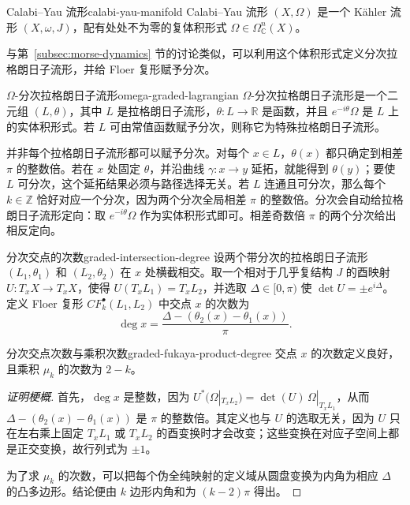 \begin{definition}{Calabi--Yau 流形}{calabi-yau-manifold}
Calabi--Yau 流形 $(X,\Omega)$ 是一个 Kähler 流形 $(X,\omega,J)$，配有处处不为零的复体积形式 $\Omega\in\Omega^n_{\mathbb C}(X)$。
\end{definition}

与第~\ref{subsec:morse-dynamics} 节的讨论类似，可以利用这个体积形式定义分次拉格朗日子流形，并给 Floer 复形赋予分次。

\begin{definition}{$\Omega$-分次拉格朗日子流形}{omega-graded-lagrangian}
$\Omega$-分次拉格朗日子流形是一个二元组 $(L,\theta)$，其中 $L$ 是拉格朗日子流形，$\theta\colon L\to\mathbb R$ 是函数，并且 $e^{-i\theta}\Omega$ 是 $L$ 上的实体积形式。若 $L$ 可由常值函数赋予分次，则称它为特殊拉格朗日子流形。
\end{definition}

并非每个拉格朗日子流形都可以赋予分次。对每个 $x\in L$，$\theta(x)$ 都只确定到相差 $\pi$ 的整数倍。若在 $x$ 处固定 $\theta$，并沿曲线 $\gamma\colon x\to y$ 延拓，就能得到 $\theta(y)$；要使 $L$ 可分次，这个延拓结果必须与路径选择无关。若 $L$ 连通且可分次，那么每个 $k\in\mathbb Z$ 恰好对应一个分次，因为两个分次全局相差 $\pi$ 的整数倍。分次会自动给拉格朗日子流形定向：取 $e^{-i\theta}\Omega$ 作为实体积形式即可。相差奇数倍 $\pi$ 的两个分次给出相反定向。

\begin{definition}{分次交点的次数}{graded-intersection-degree}
设两个带分次的拉格朗日子流形 $(L_1,\theta_1)$ 和 $(L_2,\theta_2)$ 在 $x$ 处横截相交。取一个相对于几乎复结构 $J$ 的酉映射 $U\colon T_xX\to T_xX$，使得 $U(T_xL_1)=T_xL_2$，并选取 $\Delta\in[0,\pi)$ 使 $\det U=\pm e^{i\Delta}$。定义 Floer 复形 $CF_k^\bullet(L_1,L_2)$ 中交点 $x$ 的次数为
\[
  \deg x=\frac{\Delta-(\theta_2(x)-\theta_1(x))}{\pi}.
\]
\end{definition}

\begin{lemma}{分次交点次数与乘积次数}{graded-fukaya-product-degree}
交点 $x$ 的次数定义良好，且乘积 $\mu_k$ 的次数为 $2-k$。
\end{lemma}
\begin{proof}[证明梗概]
首先，$\deg x$ 是整数，因为
$U^*(\Omega|_{T_xL_2})=\det(U)\,\Omega|_{T_xL_1}$，从而
$\Delta-(\theta_2(x)-\theta_1(x))$ 是 $\pi$ 的整数倍。其定义也与 $U$ 的选取无关，因为 $U$ 只在左右乘上固定 $T_xL_1$ 或 $T_xL_2$ 的酉变换时才会改变；这些变换在对应子空间上都是正交变换，故行列式为 $\pm1$。

为了求 $\mu_k$ 的次数，可以把每个伪全纯映射的定义域从圆盘变换为内角为相应 $\Delta$ 的凸多边形。结论便由 $k$ 边形内角和为 $(k-2)\pi$ 得出。
\end{proof}

